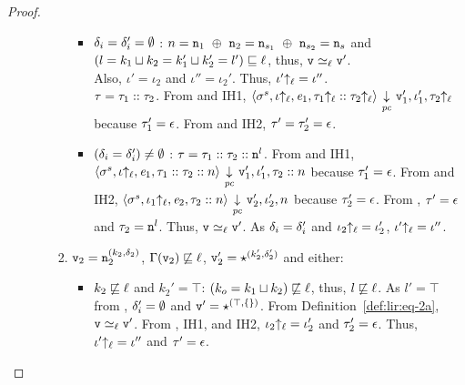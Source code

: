 \begin{proof}
\begin{itemize}[leftmargin=.5in]
\begin{enumerate}
\begin{enumerate}
        \begin{itemize}
        \item $\delta_i = \delta_i' = \emptyset$ : $n = \texttt{n}_1~\oplus~\texttt{n}_2 =
          \texttt{n}_{s_1}~\oplus~\texttt{n}_{s_2} = \texttt{n}_s$ and $(l = k_1 \sqcup k_2 = k_1'
          \sqcup k_2' = l') \sqsubseteq \ell$, thus, $\texttt{v}
          \simeq_\ell \texttt{v}'$. \\ Also, $\iota' = \iota_2$  and $\iota''
          = \iota_2'$. Thus, $\iota'{\uparrow_\ell} = \iota''$. \\    
          $\tau = \tau_1 :: \tau_2$. From  and IH1,
          $\langle \sigma^s, \iota{\uparrow_\ell}, \mathit{e}_1, \tau_1{\uparrow_\ell} ::
          \tau_2{\uparrow_\ell} \rangle {~\underset{\mathit{pc}}{\downarrow}~} \texttt{v}_1', \iota_1',
          \tau_2{\uparrow_\ell} $ because $\tau_1' = \epsilon$. From
           and IH2, $\tau' = \tau_2' = \epsilon$. 

        \item $(\delta_i = \delta_i') \neq \emptyset$ : $\tau =
          \tau_1 :: \tau_2 :: \texttt{n}^l$. From  and IH1, $\langle
          \sigma^s,  \iota{\uparrow_\ell}, \mathit{e}_1, \tau_1 :: \tau_2 :: n \rangle
          {~\underset{\mathit{pc}}{\downarrow}~} \texttt{v}_1',  \iota_1', \tau_2 :: n$
          because $\tau_1' = \epsilon$. From  and IH2,
          $\langle \sigma^s, \iota_1{\uparrow_\ell}, \mathit{e}_2, \tau_2 
          :: n \rangle {~\underset{\mathit{pc}}{\downarrow}~} \texttt{v}_2',
          \iota_2', n$ because $\tau_2' = \epsilon$. From
          , $\tau' = \epsilon$ and $\tau_2 = \texttt{n}^l$. Thus,
          $\texttt{v} \simeq_\ell \texttt{v}'$. As $\delta_i = \delta_i'$ and
          $\iota_2{\uparrow_\ell} = \iota_2'$, $\iota'{\uparrow_\ell} = \iota''$.
        \end{itemize}

      \item $\texttt{v}_2 = \texttt{n}_2^{(k_2, \delta_2)}$, $\Gamma(\texttt{v}_2) \not\sqsubseteq
        \ell$, $\texttt{v}_2' = \star^{(k_2',\delta_2')}$ and either: 
        
        \begin{itemize}
        \item $k_2 \not\sqsubseteq \ell$ and $k_2' = \top$: $(k_o
          = k_1 \sqcup k_2) \not\sqsubseteq \ell$, thus,
          $l \not\sqsubseteq \ell$. As $l' = \top$ from ,
          $\delta_i' = \emptyset$ and $\texttt{v}' = \star^{(\top, \{\})}$. From
          Definition~\ref{def:lir:eq-2a}, $\texttt{v} 
          \simeq_\ell \texttt{v}'$. From , IH1, and IH2,
          $\iota_2{\uparrow_\ell} = \iota_2'$ and $\tau_2' =
          \epsilon$. Thus, $\iota'{\uparrow_\ell} = \iota''$ and 
          $\tau' = \epsilon$.


\end{itemize}
\end{enumerate}
\end{enumerate}
\end{itemize}
\end{proof}
